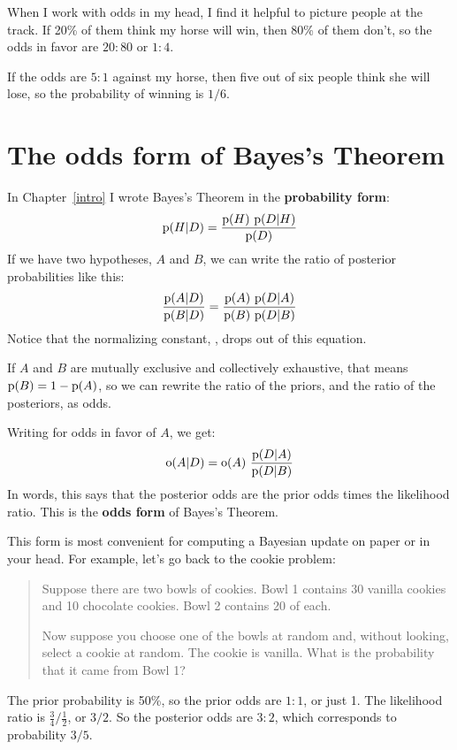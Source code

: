 \documentclass[12pt]{book}
\begin{document}
When I work with odds in my head, I find it helpful to picture
people at the track.  If 20\% of them think my horse will win,
then 80\% of them don't, so the odds in favor are $20:80$ or
$1:4$.

If the odds are $5:1$ against my horse, then five out of six
people think she will lose, so the probability of winning
is $1/6$.


\section{The odds form of Bayes's Theorem}

In Chapter~\ref{intro} I wrote Bayes's Theorem in the {\bf probability
form}:
%
\[ \mathrm{p}(H|D) = \frac{\mathrm{p}(H)~\mathrm{p}(D|H)}{\mathrm{p}(D)} \]
%
If we have two hypotheses, $A$ and $B$, 
we can write the ratio of posterior probabilities like this:
%
\[ \frac{\mathrm{p}(A|D)}{\mathrm{p}(B|D)} = \frac{\mathrm{p}(A)~\mathrm{p}(D|A)}
                                        {\mathrm{p}(B)~\mathrm{p}(D|B)} \]
%
Notice that the normalizing constant, , drops out of
this equation.

If $A$ and $B$ are mutually exclusive and collectively exhaustive,
that means $\mathrm{p}(B) = 1 - \mathrm{p}(A)$, so we can rewrite the ratio of
the priors, and the ratio of the posteriors, as odds.

Writing  for odds in favor of $A$, we get:
%
\[ \mathrm{o}(A|D) = \mathrm{o}(A)~\frac{\mathrm{p}(D|A)}{\mathrm{p}(D|B)} \]
%
In words, this says that the posterior odds are the prior odds times
the likelihood ratio.  This is the {\bf odds form} of Bayes's Theorem.

This form is most convenient for computing a Bayesian update on
paper or in your head.  For example, let's go back to the
cookie problem:

\begin{quote}
Suppose there are two bowls of cookies.  Bowl 1 contains
  30 vanilla cookies and 10 chocolate cookies.  Bowl 2 contains 20 of
  each.

Now suppose you choose one of the bowls at random and, without looking,
select a cookie at random.  The cookie is vanilla.  What is the probability
that it came from Bowl 1?
\end{quote}

The prior probability is 50\%, so the prior odds are $1:1$, or just
1.  The likelihood ratio is $\frac{3}{4} / \frac{1}{2}$, or $3/2$.
So the posterior odds are $3:2$, which corresponds to probability
$3/5$.
\end{document}

